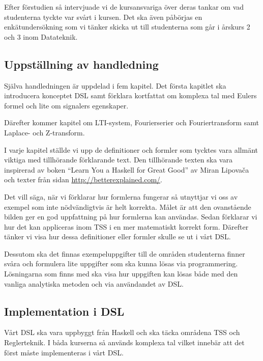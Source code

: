 \documentclass[]{article}
\begin{document}
Efter förstudien så intervjuade vi de kursansvariga över deras tankar om vad
studenterna tyckte var svårt i kursen. Det ska även påbörjas en enkätundersökning
som vi tänker skicka ut till studenterna som går i årskurs 2 och 3 inom Datateknik.


\subsection{Uppställning av handledning}


Själva handledningen är uppdelad i fem kapitel. Det första kapitlet
ska introducera konceptet DSL samt förklara kortfattat om komplexa tal
med Eulers formel och lite om signalers egenskaper.

Därefter kommer kapitel om LTI-system, Fourierserier och Fouriertransform
samt Laplace- och Z-transform.

I varje kapitel ställde vi upp de definitioner och formler som tycktes
vara allmänt viktiga med tillhörande förklarande text. Den tillhörande
texten ska vara inspirerad av boken ``Learn You a Haskell for Great
Good'' av Miran Lipovača \cite{learnyouahaskell} och texter från sidan
\url{http://betterexplained.com/}.

Det vill säga, när vi förklarar hur formlerna fungerar så utnyttjar vi
oss av exempel som inte nödvändigtvis är helt korrekta. Målet är
att den ovanstående bilden ger en god uppfattning på hur formlerna kan användas.
Sedan förklarar vi hur det kan appliceras inom TSS i en mer matematiskt korrekt form.
Därefter tänker vi visa hur dessa definitioner eller formler skulle se ut i vårt DSL.

Dessutom ska det finnas exempeluppgifter till de områden studenterna finner
svåra och formulera lite uppgifter som ska kunna lösas via programmering.
Lösningarna som finns med ska visa hur uppgiften kan lösas både med den vanliga
analytiska metoden och via användandet av DSL.

\subsection{Implementation i DSL}

Vårt DSL ska vara uppbyggt från Haskell och ska täcka områdena TSS och Reglerteknik.
I båda kurserna så används komplexa tal vilket innebär att det först måste implementeras i vårt DSL.
\end{document}
